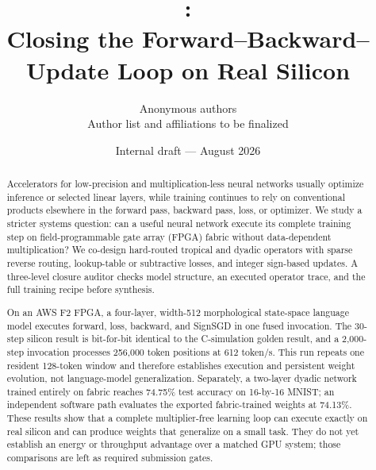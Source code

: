 \documentclass[10pt]{article}
\title{\systemname:\\
Closing the Forward--Backward--Update Loop on Real Silicon}
\author{Anonymous authors\\
\small Author list and affiliations to be finalized}
\date{Internal draft --- August 2026}
\begin{document}
\maketitle

\begin{center}
\end{center}

\begin{abstract}
Accelerators for low-precision and multiplication-less neural networks usually
optimize inference or selected linear layers, while training continues to rely
on conventional products elsewhere in the forward pass, backward pass, loss,
or optimizer.  We study a stricter systems question: can a useful neural
network execute its complete training step on field-programmable gate array
(FPGA) fabric without data-dependent multiplication?  We co-design hard-routed
tropical and dyadic operators with sparse reverse routing, lookup-table or
subtractive losses, and integer sign-based updates.  A three-level closure
auditor checks model structure, an executed operator trace, and the full
training recipe before synthesis.

On an AWS F2 FPGA, a four-layer, width-512 morphological state-space language
model executes forward, loss, backward, and SignSGD in one fused invocation.
The 30-step silicon result is bit-for-bit identical to the C-simulation golden
result, and a 2,000-step invocation processes 256,000 token positions at 612
token/s.  This run repeats one resident 128-token window and therefore
establishes execution and persistent weight evolution, not language-model
generalization.  Separately, a two-layer dyadic network trained entirely on
fabric reaches 74.75\% test accuracy on 16-by-16 MNIST; an independent software
path evaluates the exported fabric-trained weights at 74.13\%.  These results
show that a complete multiplier-free learning loop can execute exactly on real
silicon and can produce weights that generalize on a small task.  They do not
yet establish an energy or throughput advantage over a matched GPU system;
those comparisons are left as required submission gates.
\end{abstract}
\end{document}
